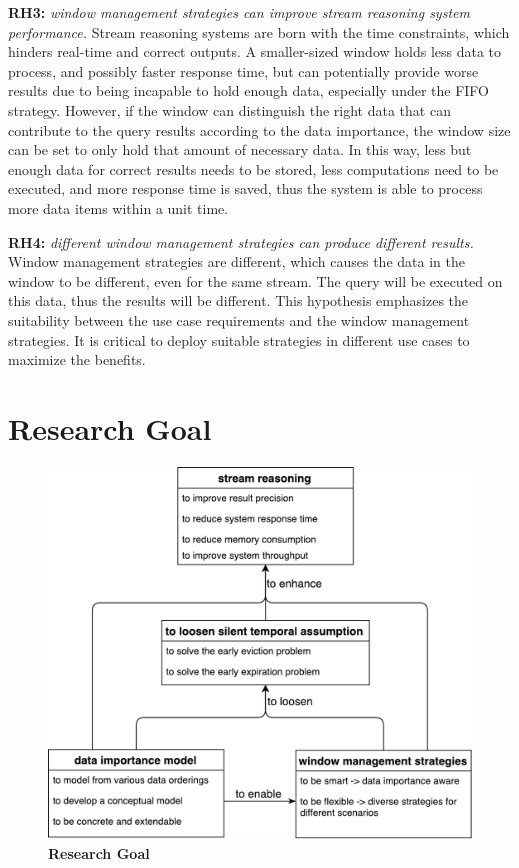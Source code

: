 \textbf{RH3:} \textit{window management strategies can improve stream reasoning system performance.}
Stream reasoning systems are born with the time constraints, which hinders real-time and correct outputs.
A smaller-sized window holds less data to process, and possibly faster response time, but can potentially provide worse results due to being incapable to hold enough data, especially under the FIFO strategy.
However, if the window can distinguish the right data that can contribute to the query results according to the data importance, the window size can be set to only hold that amount of necessary data. 
In this way, less but enough data for correct results needs to be stored, less computations need to be executed, and more response time is saved, thus the system is able to process more data items within a unit time. 

\textbf{RH4:} \textit{different window management strategies can produce different results.}
Window management strategies are different, which causes the data in the window to be different, even for the same stream. 
The query will be executed on this data, thus the results will be different. 
This hypothesis emphasizes the suitability between the use case requirements and the window management strategies. 
It is critical to deploy suitable strategies in different use cases to maximize the benefits.
%
\section{Research Goal}

\begin{figure}[!htbp]
	\centering
    \includegraphics[width=5in]{img/1-rg.pdf}
    \caption{\textbf{Research Goal}}
    \label{fig:1-rg}
\end{figure}

